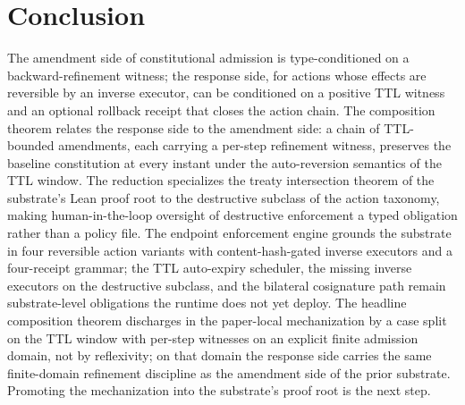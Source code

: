 \section{Conclusion}
\label{sec:conclusion-ra}

The amendment side of constitutional admission is type-conditioned on
a backward-refinement witness; the response side, for actions whose
effects are reversible by an inverse executor, can be conditioned on
a positive TTL witness and an optional rollback receipt that closes
the action chain. The composition theorem
 relates the
response side to the amendment side: a chain of TTL-bounded
amendments, each carrying a per-step refinement witness, preserves
the baseline constitution at every instant under the auto-reversion
semantics of the TTL window. The reduction
 specializes the
treaty intersection theorem of the substrate's Lean proof root to the
destructive
subclass of the action taxonomy, making human-in-the-loop oversight
of destructive enforcement a typed obligation rather than a policy
file. The endpoint enforcement engine grounds the substrate in four
reversible action variants with content-hash-gated inverse executors
and a four-receipt grammar; the TTL auto-expiry scheduler, the
missing inverse executors on the destructive subclass, and the
bilateral cosignature path remain substrate-level obligations the
runtime does not yet deploy. The headline composition theorem
discharges in the paper-local mechanization by a case split on the TTL
window with per-step witnesses on an explicit finite admission domain,
not by reflexivity; on that domain the response side carries the same
finite-domain refinement discipline as the amendment side of the prior
substrate. Promoting the mechanization into the substrate's proof root
is the next step.
